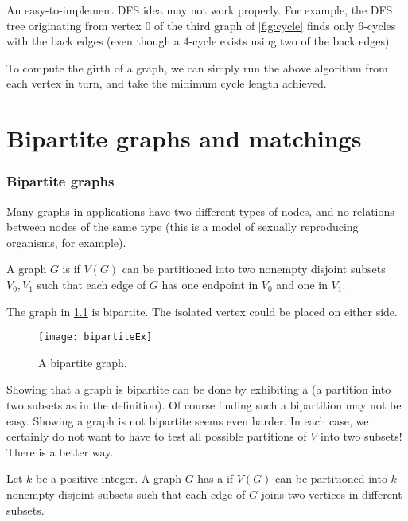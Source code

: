 \begin{note}
An easy-to-implement DFS idea may not work properly. For example,
the DFS tree originating from vertex $0$ of the third graph of
\cref{fig:cycle} finds only $6$-cycles with the back edges (even
though a $4$-cycle exists using two of the back edges).
\end{note}

To compute the girth of a graph, we can simply run the above algorithm
from each vertex in turn, and take the minimum cycle length achieved.

\chapter{Bipartite graphs and matchings}


\subsection{Bipartite graphs}
\label{subsec:bipartite}

Many graphs in applications have two different types of nodes, and no
relations between nodes of the same type (this is a model of sexually
reproducing organisms, for example).

\begin{Definition}
A graph $G$ is  if $V(G)$  can be partitioned into
two nonempty disjoint subsets $V_0, V_1$ such that each edge of $G$
has one endpoint in $V_0$ and one in $V_1$.
\end{Definition}

\begin{Example}
The graph in \cref{fig:bipartite} is bipartite.  The isolated
vertex could be placed on either side.
\end{Example}

\begin{figure}
\centering
\texttt{[image: bipartiteEx]} 
\caption{A bipartite graph.}
\label{fig:bipartite}
\end{figure}

Showing that a graph is bipartite can be done by exhibiting a
 (a partition into two subsets as in the
definition). Of course finding such a bipartition may not be easy. Showing
a graph is not bipartite seems even harder. In each case, we certainly
do not want to have to test all possible partitions of $V$ into two
subsets! There is a better way.

\begin{Definition}
Let $k$ be a positive integer. A graph $G$ has a 
if $V(G)$ can be partitioned into $k$ nonempty disjoint subsets such
that each edge of $G$ joins two vertices in different subsets.
\end{Definition}

